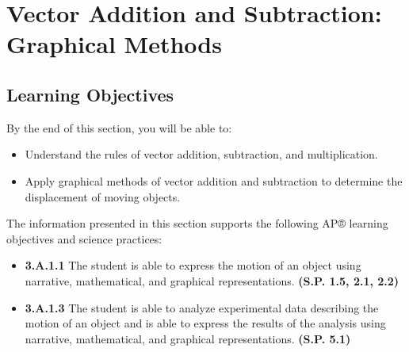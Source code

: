 \documentclass[
]{book}
\providecommand{\tightlist}{%
  \setlength{\itemsep}{0pt}\setlength{\parskip}{0pt}}
\newenvironment{learning-objectives}{}{}
\begin{document}
\hypertarget{vector-addition-and-subtraction-graphical-methods}{%
\section{Vector Addition and Subtraction: Graphical Methods}\label{vector-addition-and-subtraction-graphical-methods}}

\hypertarget{fs-id2265665}{}
\begin{learning-objectives}

\hypertarget{learning-objectives-8}{%
\subsection{Learning Objectives}\label{learning-objectives-8}}

By the end of this section, you will be able to:

\begin{itemize}
\tightlist
\item
  Understand the rules of vector addition, subtraction, and
  multiplication.
\item
  Apply graphical methods of vector addition and subtraction to
  determine the displacement of moving objects.
\end{itemize}

The information presented in this section supports the following AP®
learning objectives and science practices:

\begin{itemize}
\tightlist
\item
  \textbf{3.A.1.1} The student is able to express the motion of an object
  using narrative, mathematical, and graphical representations.
  \textbf{(S.P. 1.5, 2.1, 2.2)}
\item
  \textbf{3.A.1.3} The student is able to analyze experimental data
  describing the motion of an object and is able to express the
  results of the analysis using narrative, mathematical, and graphical
  representations. \textbf{(S.P. 5.1)}
\end{itemize}

\end{learning-objectives}
\end{document}
